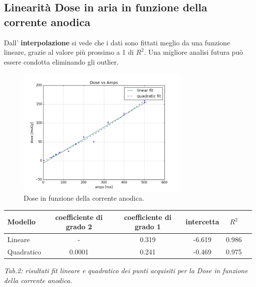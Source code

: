 \documentclass[a4paper]{article}
\begin{document}
\subsection{Linearità Dose in aria in funzione della corrente anodica}
Dall' \textbf{interpolazione} si vede che i dati sono fittati meglio da una funzione lineare, grazie al valore più prossimo a 1 di $R^{2}$. Una migliore analisi futura può essere condotta eliminando gli outlier.
\begin{figure}[H]
\centering
\includegraphics[width=0.75\textwidth]{dosevsamps.png}
\caption{Dose in funzione della corrente anodica.}
\end{figure}

\begin{center} 
		
		\begin{tabular}{lccccc}
			\hline
			\hline
			\textbf{Modello}	& \textbf{coefficiente di grado 2}& \textbf{coefficiente di grado 1}& \textbf{intercetta}&  \textbf{$R^{2}$} 	 \\
			\hline
			\hline
			Lineare	&-&0.319&-6.619&0.986	\\
			Quadratico	&0.0001&0.241&-0.469&0.975\\
			
			
			\hline
			\hline
		\end{tabular}
		\linebreak
		\emph{Tab.2: risultati fit lineare e quadratico dei punti acquisiti per la Dose in funzione della corrente anodica.} 
	\end{center}

\end{document}
